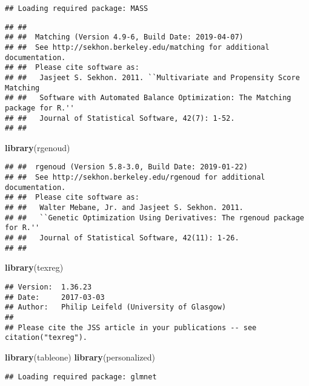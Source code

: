 \documentclass[]{article}
\newenvironment{Shaded}{\begin{snugshade}}{\end{snugshade}}
\newcommand{\KeywordTok}[1]{\textcolor[rgb]{0.13,0.29,0.53}{\textbf{#1}}}
\newcommand{\NormalTok}[1]{#1}
\begin{document}
\begin{verbatim}
## Loading required package: MASS
\end{verbatim}

\begin{verbatim}
## ## 
## ##  Matching (Version 4.9-6, Build Date: 2019-04-07)
## ##  See http://sekhon.berkeley.edu/matching for additional documentation.
## ##  Please cite software as:
## ##   Jasjeet S. Sekhon. 2011. ``Multivariate and Propensity Score Matching
## ##   Software with Automated Balance Optimization: The Matching package for R.''
## ##   Journal of Statistical Software, 42(7): 1-52. 
## ##
\end{verbatim}

\begin{Shaded}
\begin{Highlighting}[]
\KeywordTok{library}\NormalTok{(rgenoud)}
\end{Highlighting}
\end{Shaded}

\begin{verbatim}
## ##  rgenoud (Version 5.8-3.0, Build Date: 2019-01-22)
## ##  See http://sekhon.berkeley.edu/rgenoud for additional documentation.
## ##  Please cite software as:
## ##   Walter Mebane, Jr. and Jasjeet S. Sekhon. 2011.
## ##   ``Genetic Optimization Using Derivatives: The rgenoud package for R.''
## ##   Journal of Statistical Software, 42(11): 1-26. 
## ##
\end{verbatim}

\begin{Shaded}
\begin{Highlighting}[]
\KeywordTok{library}\NormalTok{(texreg)}
\end{Highlighting}
\end{Shaded}

\begin{verbatim}
## Version:  1.36.23
## Date:     2017-03-03
## Author:   Philip Leifeld (University of Glasgow)
## 
## Please cite the JSS article in your publications -- see citation("texreg").
\end{verbatim}

\begin{Shaded}
\begin{Highlighting}[]
\KeywordTok{library}\NormalTok{(tableone)}
\KeywordTok{library}\NormalTok{(personalized)}
\end{Highlighting}
\end{Shaded}

\begin{verbatim}
## Loading required package: glmnet
\end{verbatim}
\end{document}
